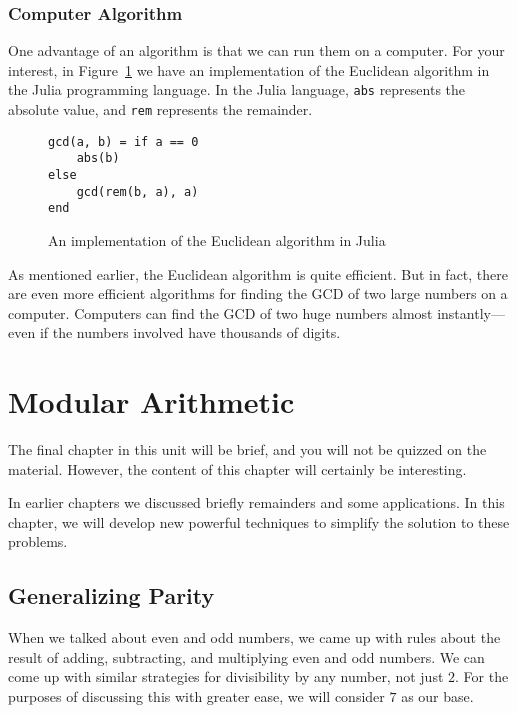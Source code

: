\documentclass[a4paper,10pt]{report}
\begin{document}
\subsection{Computer Algorithm}

One advantage of an algorithm is that we can run them on a computer. For your
interest, in Figure~\ref{gcd:julia} we have an \gls{implementation} of the
Euclidean algorithm in the Julia \gls{programming language}. In the Julia
language, \verb|abs| represents the absolute value, and \verb|rem| represents
the remainder.

\begin{figure}
  \begin{verbatim}
gcd(a, b) = if a == 0
    abs(b)
else
    gcd(rem(b, a), a)
end
  \end{verbatim}
  \caption{An implementation of the Euclidean algorithm in Julia}

  \label{gcd:julia}
\end{figure}

As mentioned earlier, the Euclidean algorithm is quite efficient. But in fact,
there are even more efficient algorithms for finding the GCD of two large
numbers on a computer. Computers can find the GCD of two huge numbers almost
instantly---even if the numbers involved have thousands of digits.

\chapter{Modular Arithmetic}

The final chapter in this unit will be brief, and you will not be quizzed on
the material. However, the content of this chapter will certainly be
interesting.

In earlier chapters we discussed briefly remainders and some applications. In
this chapter, we will develop new powerful techniques to simplify the solution
to these problems.

\section{Generalizing Parity}

When we talked about even and odd numbers, we came up with rules about the
result of adding, subtracting, and multiplying even and odd numbers. We can
come up with similar strategies for divisibility by any number, not just \(2\).
For the purposes of discussing this with greater ease, we will consider \(7\)
as our base.
\end{document}
